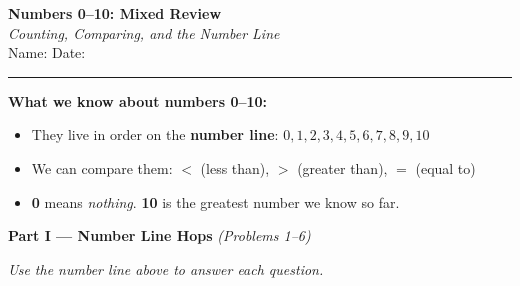 \documentclass[12pt, letterpaper]{article}
\newcommand{\answerline}{\underline{\hspace{2.5cm}}}
\newcommand{\biganswerline}{\underline{\hspace{4cm}}}
\begin{document}
\begin{center}
  {\LARGE\textbf{\textcolor{scholared}{Numbers 0–10: Mixed Review}}}\\[4pt]
  {\Large\textcolor{scholagold}{\textit{Counting, Comparing, and the Number Line}}}\\[6pt]
  {\small Name: \biganswerline \hspace{1cm} Date: \answerline}
\end{center}

\vspace{4pt}
\noindent\textcolor{scholared}{\rule{\linewidth}{1pt}}
\vspace{4pt}


\begin{lessonbox}
\textbf{What we know about numbers 0–10:}
\begin{itemize}[leftmargin=1.5em, itemsep=2pt]
  \item They live in order on the \textbf{number line}: $0, 1, 2, 3, 4, 5, 6, 7, 8, 9, 10$
  \item We can compare them: $<$ (less than), $>$ (greater than), $=$ (equal to)
  \item \textbf{0} means \textit{nothing}. \textbf{10} is the greatest number we know so far.
\end{itemize}
\end{lessonbox}

\bigskip

\noindent\textcolor{scholared}{\large\textbf{Part I — Number Line Hops}} \hfill \textit{(Problems 1–6)}

\medskip

\begin{center}
\end{center}

\medskip
\noindent\textit{Use the number line above to answer each question.}
\end{document}
